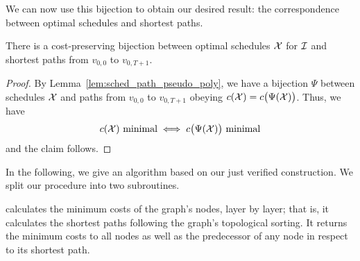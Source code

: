 We can now use this bijection to obtain our desired result: the correspondence between optimal schedules and shortest paths.
\begin{thm}\label{thm:opt_sched_short_path_pseudo_poly}
There is a cost-preserving bijection between optimal schedules $\mathcal{X}$ for $\mathcal{I}$ and shortest paths from $v_{0,0}$ to $v_{0,T+1}$.
\end{thm} 
\begin{proof}
By Lemma~\ref{lem:sched_path_pseudo_poly}, we have a bijection $\Psi$ between schedules $\mathcal{X}$ and paths from $v_{0,0}$ to $v_{0,T+1}$ obeying $c(\mathcal{X})=c\bigl(\Psi(\mathcal{X})\bigr)$. Thus, we have 
\begin{equation*}
	c(\mathcal{X})\text{ minimal}\iff c\bigl(\Psi(\mathcal{X})\big)\text{ minimal}
\end{equation*}
and the claim follows.
\end{proof}
In the following, we give an algorithm based on our just verified construction. 
We split our procedure into two subroutines. 

 calculates the minimum costs of the graph's nodes, layer by layer; that is, it calculates the shortest paths following the graph's topological sorting. It returns the minimum costs to all nodes as well as the predecessor of any node in respect to its shortest path.

